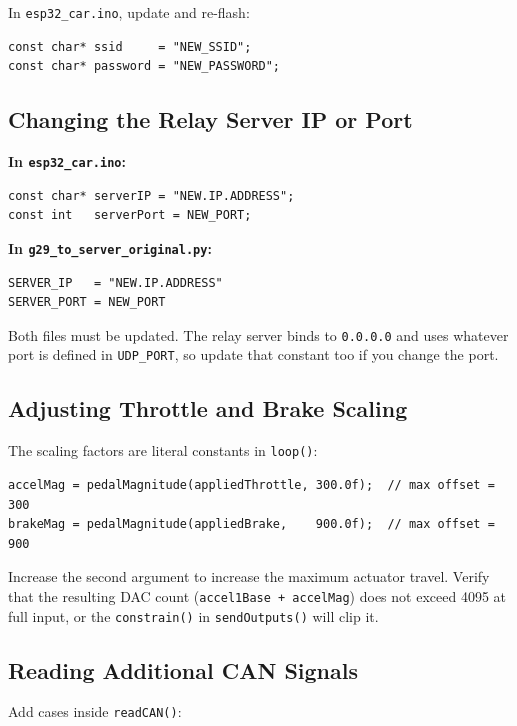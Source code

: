 \documentclass[12pt, letterpaper]{article}
\begin{document}
In \texttt{esp32\_car.ino}, update and re-flash:

\begin{lstlisting}[style=cpp]
const char* ssid     = "NEW_SSID";
const char* password = "NEW_PASSWORD";
\end{lstlisting}

\subsection{Changing the Relay Server IP or Port}

\textbf{In \texttt{esp32\_car.ino}:}
\begin{lstlisting}[style=cpp]
const char* serverIP = "NEW.IP.ADDRESS";
const int   serverPort = NEW_PORT;
\end{lstlisting}

\textbf{In \texttt{g29\_to\_server\_original.py}:}
\begin{lstlisting}[style=python]
SERVER_IP   = "NEW.IP.ADDRESS"
SERVER_PORT = NEW_PORT
\end{lstlisting}

Both files must be updated.  The relay server binds to \texttt{0.0.0.0} and uses
whatever port is defined in \texttt{UDP\_PORT}, so update that constant too if
you change the port.

\subsection{Adjusting Throttle and Brake Scaling}

The scaling factors are literal constants in \texttt{loop()}:

\begin{lstlisting}[style=cpp]
accelMag = pedalMagnitude(appliedThrottle, 300.0f);  // max offset = 300
brakeMag = pedalMagnitude(appliedBrake,    900.0f);  // max offset = 900
\end{lstlisting}

Increase the second argument to increase the maximum actuator travel.
Verify that the resulting DAC count (\texttt{accel1Base + accelMag}) does not
exceed 4095 at full input, or the \texttt{constrain()} in \texttt{sendOutputs()}
will clip it.

\subsection{Reading Additional CAN Signals}

Add cases inside \texttt{readCAN()}:
\end{document}
